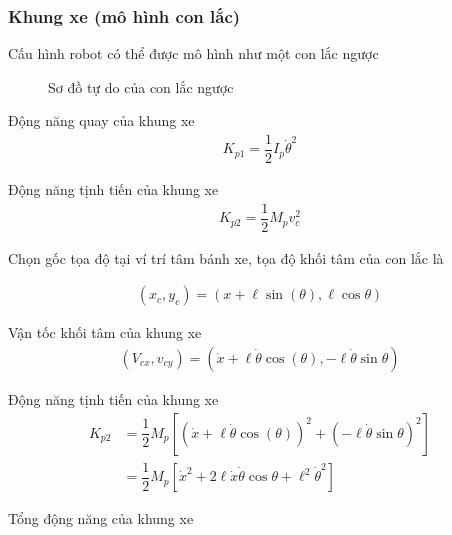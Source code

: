     

        
        
    \subsubsection*{Khung xe (mô hình con lắc)}
        \hspace*{0.6cm}Cấu hình robot có thể được mô hình như một con lắc ngược
            \begin{figure}[H]
                \centering
                \caption{Sơ đồ tự do của con lắc ngược}
            \end{figure}
            
            Động năng quay của khung xe
            \begin{align}
                K_{p1} = \dfrac{1}{2} I_p \dot{\theta}^2 
            \end{align}
            
            Động năng tịnh tiến của khung xe
            \begin{align}
                K_{p2} = \dfrac{1}{2} M_p v_c^2
            \end{align}
            
            Chọn gốc tọa độ tại ví trí tâm bánh xe, tọa độ khối tâm của con lắc là

            \begin{align}
                (x_c, y_c) = (x+\ell \sin(\theta), \ell \cos \theta) 
            \end{align}
            
            Vận tốc khối tâm của khung xe
            \begin{align}
                (V_{cx}, v_{cy}) = (\dot{x}+\ell \dot{\theta} \cos(\theta), -\ell \dot{\theta}\sin \theta) 
            \end{align}

            Động năng tịnh tiến của khung xe
            \begin{align}
                K_{p2} &= \dfrac{1}{2} M_p \left[(\dot{x}+\ell \dot{\theta} \cos(\theta))^2 + (-\ell \dot{\theta}\sin \theta)^2\right] \nonumber\\
                       &=\dfrac{1}{2} M_p \left[\dot{x}^2 + 2 \ell \dot{x} \dot{\theta} \cos \theta + \ell^2 \dot{\theta}^2\right] 
            \end{align}
            
            Tổng động năng của khung xe
            
